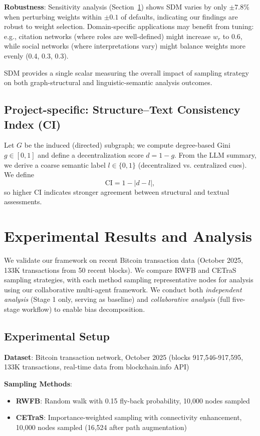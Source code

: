 \documentclass[conference]{IEEEtran}
\begin{document}
\textbf{Robustness}: Sensitivity analysis (Section~\ref{sec:results}) shows SDM varies by only $\pm 7.8\%$ when perturbing weights within $\pm 0.1$ of defaults, indicating our findings are robust to weight selection. Domain-specific applications may benefit from tuning: e.g., citation networks (where roles are well-defined) might increase $w_r$ to 0.6, while social networks (where interpretations vary) might balance weights more evenly (0.4, 0.3, 0.3).

SDM provides a single scalar measuring the overall impact of sampling strategy on both graph-structural and linguistic-semantic analysis outcomes.


\subsection{Project-specific: Structure–Text Consistency Index (CI)}
Let \(G\) be the induced (directed) subgraph; we compute degree-based Gini \(g\in[0,1]\) and define a decentralization score \(d=1-g\).
From the LLM summary, we derive a coarse semantic label \(l\in\{0,1\}\) (decentralized vs. centralized cues).
We define
\[
\mathrm{CI}=1-\lvert d-l\rvert,
\]
so higher CI indicates stronger agreement between structural and textual assessments.


\section{Experimental Results and Analysis}\label{sec:results}

We validate our framework on recent Bitcoin transaction data (October 2025, 133K transactions from 50 recent blocks). We compare RWFB and CETraS sampling strategies, with each method sampling representative nodes for analysis using our collaborative multi-agent framework. We conduct both \textit{independent analysis} (Stage 1 only, serving as baseline) and \textit{collaborative analysis} (full five-stage workflow) to enable bias decomposition.

\subsection{Experimental Setup}

\textbf{Dataset}: Bitcoin transaction network, October 2025 (blocks 917,546-917,595, 133K transactions, real-time data from blockchain.info API)

\textbf{Sampling Methods}:
\begin{itemize}
    \item \textbf{RWFB}: Random walk with 0.15 fly-back probability, 10,000 nodes sampled
    \item \textbf{CETraS}: Importance-weighted sampling with connectivity enhancement, 10,000 nodes sampled (16,524 after path augmentation)
\end{itemize}
\end{document}
